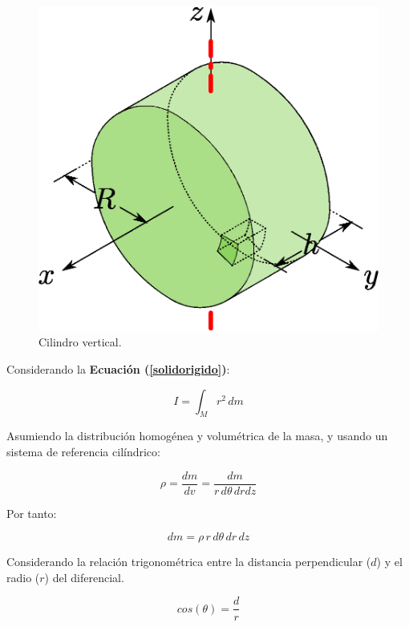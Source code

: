 \documentclass[letter,oneside,11pt]{article}
\begin{document}
\begin{figure}
\centering
\includegraphics[scale=0.5]{resources/f18.eps}
\caption{Cilindro vertical.}
\label{figura18}
\end{figure}

Considerando la \textbf{Ecuación (\ref{solidorigido})}:

\begin{equation*}
    I = \int_{M} r^2\, dm
\tag{4}
\end{equation*}

Asumiendo la distribución homogénea y volumétrica de la masa, y usando un
sistema de referencia cilíndrico:

\begin{equation*}
    \rho = \frac{dm}{dv} = \frac{dm}{r\, d\theta\, dr dz}
\end{equation*}

Por tanto:

\begin{equation}
    dm = \rho\, r\, d\theta\, dr\, dz
\label{dm13}
\end{equation}

Considerando la relación trigonométrica entre la distancia perpendicular ($d$) y
el radio ($r$) del diferencial.

\begin{equation*}
    cos (\theta) = \frac{d}{r}
\end{equation*}
\end{document}
